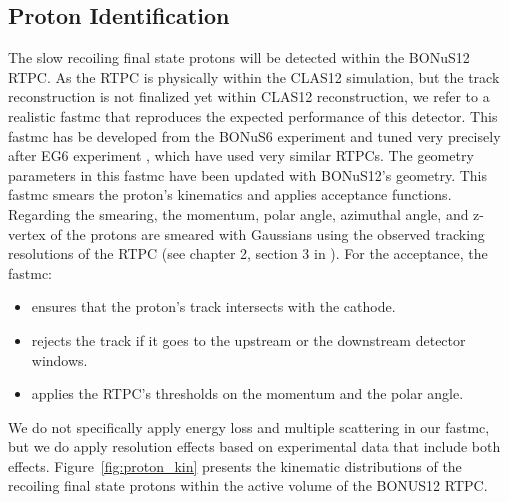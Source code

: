 \subsection{Proton Identification}
The slow recoiling final state protons will be detected within the BONuS12 
RTPC. As the RTPC is physically within the CLAS12 simulation, but the track 
reconstruction is not finalized yet within CLAS12 reconstruction, we refer to a 
realistic fastmc that reproduces the expected performance of this detector.  
This fastmc has be developed from the BONuS6 experiment and tuned very 
precisely after EG6 experiment \cite{eg6_note}, which have used very similar 
RTPCs. The geometry parameters in this fastmc have been updated with BONuS12's 
geometry. This fastmc smears the proton's kinematics and applies acceptance 
functions. Regarding the smearing, the momentum, polar angle, azimuthal angle, 
and z-vertex of the protons are smeared with Gaussians using the observed 
tracking resolutions of the RTPC (see chapter 2, section 3 in \cite{eg6_note}).  
For the acceptance, the fastmc:
\begin{itemize}
   \item ensures that the proton's track intersects with the cathode.
\item rejects the track if it goes to the upstream or the downstream detector 
   windows.
\item applies the RTPC's thresholds on the momentum and the polar angle.
\end{itemize} 
We do not specifically apply energy loss and multiple scattering in our fastmc, 
but we do apply resolution effects based on experimental data that include both 
effects. Figure~\ref{fig:proton_kin} presents the kinematic distributions of 
the recoiling final state protons within the active volume of the BONUS12 RTPC. 

